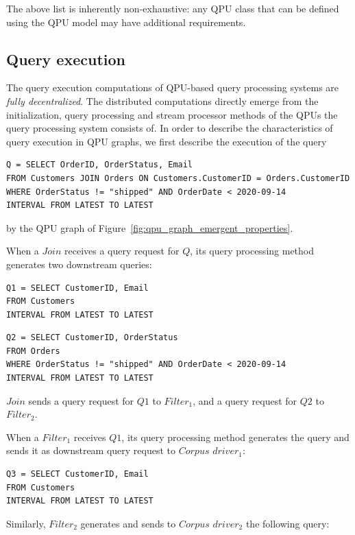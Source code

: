 The above list is inherently non-exhaustive:
any QPU class that can be defined using the QPU model may have additional requirements.

\subsection{Query execution}
\label{sec:computation_model}

The query execution computations of QPU-based query processing systems are \textit{fully decentralized}.
The distributed computations directly emerge from the initialization, query processing and stream processor methods of the QPUs
the query processing system consists of.
In order to describe the characteristics of query execution in QPU graphs, we first describe the execution of the query
\begin{lstlisting}
Q = SELECT OrderID, OrderStatus, Email
FROM Customers JOIN Orders ON Customers.CustomerID = Orders.CustomerID
WHERE OrderStatus != "shipped" AND OrderDate < 2020-09-14
INTERVAL FROM LATEST TO LATEST
\end{lstlisting}

by the QPU graph of Figure~\ref{fig:qpu_graph_emergent_properties}.

When a $Join$ receives a query request for $Q$, its query processing method generates two downstream queries:
\begin{lstlisting}
Q1 = SELECT CustomerID, Email
FROM Customers
INTERVAL FROM LATEST TO LATEST
\end{lstlisting}

\begin{lstlisting}
Q2 = SELECT CustomerID, OrderStatus
FROM Orders
WHERE OrderStatus != "shipped" AND OrderDate < 2020-09-14
INTERVAL FROM LATEST TO LATEST
\end{lstlisting}

$Join$ sends a query request for $Q1$ to $Filter_1$, and a query request for $Q2$ to $Filter_2$.

When a $Filter_1$ receives $Q1$, its query processing method generates the query and sends it as downstream query request
to $Corpus$ $driver_1$:

\begin{lstlisting}
Q3 = SELECT CustomerID, Email
FROM Customers
INTERVAL FROM LATEST TO LATEST
\end{lstlisting}

Similarly, $Filter_2$ generates and sends to $Corpus$ $driver_2$ the following query:

